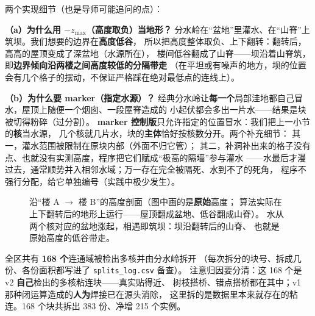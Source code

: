 两个实现细节（也是导师可能追问的点）：

\textbf{（a）为什么用 $-z_{\max}$（高度取负）当地形？}
分水岭在``盆地''里灌水、在``山脊''上筑坝。我们想要的边界在\textbf{高度低谷}，
所以把高度整体取负、上下翻转：翻转后，高高的屋顶变成了深盆地（水源所在），
楼间低谷翻成了山脊——坝沿着山脊筑，即\textbf{边界倾向沿两楼之间高度较低的分隔带走}
（在平坦或有噪声的地方，坝的位置会有几个格子的摆动，不保证严格踩在绝对最低点的连线上）。

\textbf{（b）为什么要 marker（指定水源）？}
经典分水岭让\textbf{每一个}局部洼地都自己冒水，屋顶上随便一个烟囱、一段屋脊造成的
小起伏都会多出一片水——结果是块被切得粉碎（过分割）。
\textbf{marker 控制版}只允许指定的位置冒水：我们把上一小节的\textbf{核}当水源，
几个核就几片水，块的\textbf{主体}恰好按核数分开。两个补充细节：
其一，灌水范围被限制在原块内部（外面不归它管）；
其二，补洞补出来的格子没有点、也就没有实测高度，程序把它们赋成``极高的隔墙''参与灌水
——水最后才漫过去，通常顺势并入相邻水域；万一存在完全被隔死、水到不了的死角，
程序不强行分配，给它单独编号（实践中极少发生）。

\begin{figure}[H]
\centering
{}
\caption{沿``楼 A $\to$ 楼 B''的高度剖面（图中画的是\textbf{原始}高度；
算法实际在上下翻转后的地形上运行——屋顶翻成盆地、低谷翻成山脊）。
水从两个核对应的盆地涨起，相遇即筑坝：坝沿翻转后的山脊、
也就是原始高度的低谷带走。}
\label{fig:watershed}
\end{figure}

\begin{numbox}[：拆分战果]
全区共有 \textbf{168 个}连通域被检出多核并由分水岭拆开
（每次拆分的块号、拆成几份、各份面积都写进了 \texttt{splits\_log.csv} 备查）。
注意归因要分清：这 168 个是 v2 \textbf{自己}检出的多核粘连块——真实贴得近、
树枝搭桥、错点搭桥都在其中；v1 那种闭运算造成的\textbf{人为}焊接已在源头消除，
这里拆的是数据里本来就存在的粘连。168 个块共拆出 383 份、净增 215 个实例。
\end{numbox}

